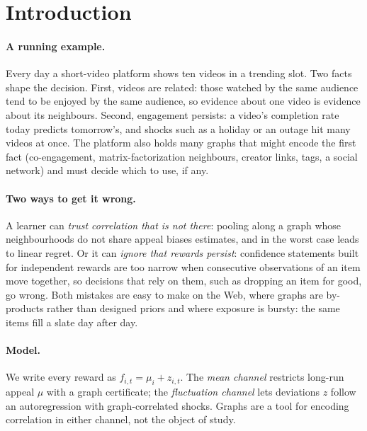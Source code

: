 \documentclass[11pt]{article}
\theoremstyle{definition}
\theoremstyle{remark}
\begin{document}
\tableofcontents
\newpage

\section{Introduction}

\paragraph{A running example.} Every day a short-video platform shows ten videos in a trending slot. Two facts shape the decision. First, videos are related: those watched by the same audience tend to be enjoyed by the same audience, so evidence about one video is evidence about its neighbours. Second, engagement persists: a video's completion rate today predicts tomorrow's, and shocks such as a holiday or an outage hit many videos at once. The platform also holds many graphs that might encode the first fact (co-engagement, matrix-factorization neighbours, creator links, tags, a social network) and must decide which to use, if any.

\paragraph{Two ways to get it wrong.} A learner can \emph{trust correlation that is not there}: pooling along a graph whose neighbourhoods do not share appeal biases estimates, and in the worst case leads to linear regret. Or it can \emph{ignore that rewards persist}: confidence statements built for independent rewards are too narrow when consecutive observations of an item move together, so decisions that rely on them, such as dropping an item for good, go wrong. Both mistakes are easy to make on the Web, where graphs are by-products rather than designed priors and where exposure is bursty: the same items fill a slate day after day.

\paragraph{Model.} We write every reward as $f_{i,t}=\mu_i+z_{i,t}$. The \emph{mean channel} restricts long-run appeal $\mu$ with a graph certificate; the \emph{fluctuation channel} lets deviations $z$ follow an autoregression with graph-correlated shocks. Graphs are a tool for encoding correlation in either channel, not the object of study.
\end{document}

